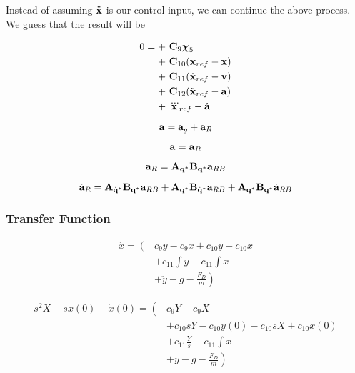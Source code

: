 Instead of assuming $\ddot{\mathbf{x}}$ is our control input, we can continue the above process. We guess that the result will be

\begin{align}\nonumber
0 = + &~ \mathbf{C}_{9} \boldsymbol\chi_5 \\\nonumber
+ &~ \mathbf{C}_{10} (\mathbf{x}_{ref} - \mathbf{x}) \\\nonumber
+ &~ \mathbf{C}_{11} (\dot{\mathbf{x}}_{ref} - \mathbf{v}) \\\nonumber
+ &~ \mathbf{C}_{12} ( \ddot{\mathbf{x}}_{ref} - \mathbf{a} ) \\\nonumber
+ &~ \dddot{\mathbf{x}}_{ref} - \dot{\mathbf{a}}
\end{align}

\[
\mathbf{a} = \mathbf{a}_{g} + \mathbf{a}_{R}
\]

\[
\dot{\mathbf{a}} = \dot{\mathbf{a}}_{R}
\]

\[
\mathbf{a}_R = \mathbf{A}_{\mathbf{q}^*} \mathbf{B}_{\mathbf{q}^*} \mathbf{a}_{RB}
\]

\[
\dot{\mathbf{a}}_R = \mathbf{A}_{\dot{\mathbf{q}}^*} \mathbf{B}_{\mathbf{q}^*} \mathbf{a}_{RB} + \mathbf{A}_{\mathbf{q}^*} \mathbf{B}_{\dot{\mathbf{q}}^*} \mathbf{a}_{RB} + \mathbf{A}_{\mathbf{q}^*} \mathbf{B}_{\mathbf{q}^*} \dot{\mathbf{a}}_{RB}
\]



\subsubsection{Transfer Function}

\begin{align}\nonumber
	\ddot{x} = \left( \right. & c_9 y - c_9 x + c_{10} \dot{y} - c_{10} \dot{x} \\\nonumber
	& + c_{11} \int y - c_{11} \int x \\\nonumber
	& + \left. \ddot{y} - g - \frac{F_D}{m} \right)
\end{align}


\begin{align}\nonumber
	s^2 X - s x(0) - \dot{x}(0) = \left( \right. & c_9 Y - c_9 X \\\nonumber
	& + c_{10} sY - c_{10} y(0) - c_{10} sX + c_{10} x(0) \\\nonumber
	& + c_{11} \frac{Y}{s} - c_{11} \int x \\\nonumber
	& + \left. \ddot{y} - g - \frac{F_D}{m} \right)
\end{align}







